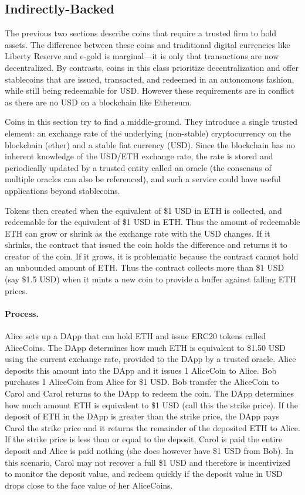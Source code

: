 \subsection{Indirectly-Backed}
\label{sec:dai}

The previous two sections describe coins that require a trusted firm to hold assets. The difference between these coins and traditional digital currencies like Liberty Reserve and e-gold is marginal---it is only that transactions are now decentralized. By contrasts, coins in this class prioritize decentralization and offer stablecoins that are issued, transacted, and redeemed in an autonomous fashion, while still being redeemable for USD. However these requirements are in conflict as there are no USD on a blockchain like Ethereum.

Coins in this section try to find a middle-ground. They introduce a single trusted element: an exchange rate of the underlying (non-stable) cryptocurrency on the blockchain (\eg ether) and a stable fiat currency (\eg USD). Since the blockchain has no inherent knowledge of the USD/ETH exchange rate, the rate is stored and periodically updated by a trusted entity called an oracle (the consensus of multiple oracles can also be referenced), and such a service could have useful applications beyond stablecoins.

Tokens then created when the equivalent of \$1 USD in ETH is collected, and redeemable for the equivalent of \$1 USD in ETH. Thus the amount of redeemable ETH can grow or shrink as the exchange rate with the USD changes. If it shrinks, the contract that issued the coin holds the difference and returns it to creator of the coin. If it grows, it is problematic because the contract cannot hold an unbounded amount of ETH. Thus the contract collects more than \$1 USD (say \$1.5 USD) when it mints a new coin to provide a buffer against falling ETH prices.

\paragraph{Process.} Alice sets up a DApp that can hold ETH and issue ERC20 tokens called AliceCoins. The DApp determines how much ETH is equivalent to \$1.50 USD using the current exchange rate, provided to the DApp by a trusted oracle. Alice deposits this amount into the DApp and it issues 1 AliceCoin to Alice. Bob purchases 1 AliceCoin from Alice for \$1 USD. Bob transfer the AliceCoin to Carol and Carol returns to the DApp to redeem the coin. The DApp determines how much amount ETH is equivalent to \$1 USD (call this the strike price). If the deposit of ETH in the DApp is greater than the strike price, the DApp pays Carol the strike price and it returns the remainder of the deposited ETH to Alice. If the strike price is less than or equal to the deposit, Carol is paid the entire deposit and Alice is paid nothing (she does however have \$1 USD from Bob). In this scenario, Carol may not recover a full \$1 USD and therefore is incentivized to monitor the deposit value, and redeem quickly if the deposit value in USD drops close to the face value of her AliceCoins.

